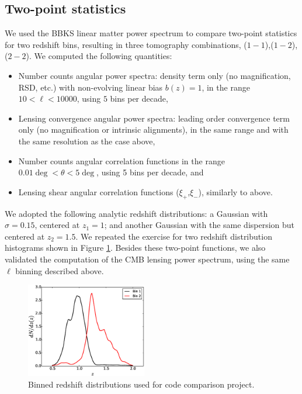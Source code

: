 \documentclass[\docopts]{\docclass}
\begin{document}
\subsection{Two-point statistics}

We used the BBKS linear matter power spectrum to compare two-point statistics for two redshift bins, resulting in three tomography combinations, ($1-1$),($1-2$),($2-2$). We computed the following quantities:
\begin{itemize}
\item Number counts angular power spectra: density term only (no magnification, RSD, etc.) with non-evolving linear bias $b(z) = 1$, in the range $10 < \ell < 10000$, using $5$ bins per decade,
\item Lensing convergence angular power spectra: leading order convergence term only (no magnification or intrinsic alignments), in the same range and with the same resolution as the case above,
\item Number counts angular correlation functions in the range $0.01 \deg < \theta < 5 \deg$, using 5 bins per decade, and
\item Lensing shear angular correlation functions ($\xi_+$,$\xi_-$), similarly to above.
\end{itemize}
We adopted the following analytic redshift distributions: a Gaussian with $\sigma = 0.15$, centered at $z_1 = 1$; and another Gaussian with the same dispersion but centered at $z_2 = 1.5$. We repeated the exercise for two redshift distribution histograms shown in Figure \ref{fig:zhistos}. Besides these two-point functions, we also validated the computation of the CMB lensing power spectrum, using the same $\ell$ binning described above. 

\begin{figure}
\centering
\includegraphics[width=0.47\textwidth]{zdist.eps}
\caption{Binned redshift distributions used for code comparison project.}
\label{fig:zhistos}
\end{figure}
\end{document}
